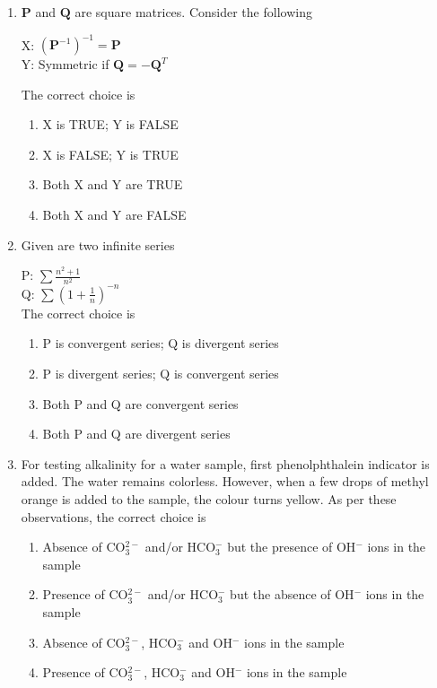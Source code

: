\documentclass[journal,12pt,onecolumn]{IEEEtran}
\theoremstyle{remark}
\begin{document}
\begin{enumerate}
\item $\mathbf{P}$ and $\mathbf{Q}$ are square matrices. Consider the following

X: $(\mathbf{P}^{-1})^{-1} = \mathbf{P}$ \\
Y: Symmetric if $\mathbf{Q} = -\mathbf{Q}^T$

The correct choice is

\begin{enumerate}
\item X is TRUE; Y is FALSE
\item X is FALSE; Y is TRUE
\item Both X and Y are TRUE
\item Both X and Y are FALSE
\end{enumerate}
\hfill{}
\item Given are two infinite series 

P: $\sum \frac{n^2 + 1}{n^2}$ \\
Q: $\sum \left( 1 + \frac{1}{n} \right)^{-n}$ \\

The correct choice is

\begin{enumerate}
\item P is convergent series; Q is divergent series
\item P is divergent series; Q is convergent series
\item Both P and Q are convergent series
\item Both P and Q are divergent series
\end{enumerate}
\hfill{}

\item For testing alkalinity for a water sample, first phenolphthalein indicator is added. The water remains colorless. However, when a few drops of methyl orange is added to the sample, the colour turns yellow. As per these observations, the correct choice is

\begin{enumerate}
\item Absence of CO$_3^{2-}$ and/or HCO$_3^-$ but the presence of OH$^-$ ions in the sample
\item Presence of CO$_3^{2-}$ and/or HCO$_3^-$ but the absence of OH$^-$ ions in the sample
\item Absence of CO$_3^{2-}$, HCO$_3^-$ and OH$^-$ ions in the sample
\item Presence of CO$_3^{2-}$, HCO$_3^-$ and OH$^-$ ions in the sample
\end{enumerate}


\end{enumerate}
\end{document}
